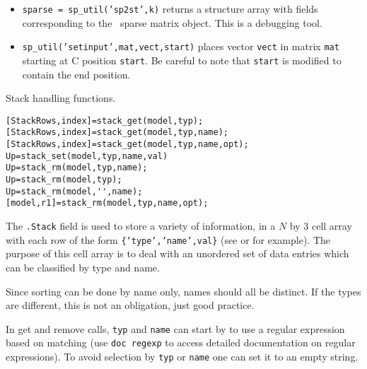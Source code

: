 \begin{itemize}
\item {\tt sparse = sp\_util('sp2st',k)} returns a structure array with fields corresponding to the \matlab\ sparse matrix object. This is a debugging tool.

\item {\tt sp\_util('setinput',mat,vect,start)} places vector {\tt vect} in matrix {\tt mat} starting at C position {\tt start}. Be careful to note that {\tt start} is modified to contain the end position. 

\end{itemize}


Stack handling functions.

\rsyntax\begin{verbatim}
[StackRows,index]=stack_get(model,typ);
[StackRows,index]=stack_get(model,typ,name);
[StackRows,index]=stack_get(model,typ,name,opt);
Up=stack_set(model,typ,name,val)
Up=stack_rm(model,typ,name);
Up=stack_rm(model,typ);
Up=stack_rm(model,'',name);
[model,r1]=stack_rm(model,typ,name,opt);
\end{verbatim}\nlvs


The {\tt .Stack} field is used to store a variety of information, in a $N$ by $3$ cell array with each row of the form {\tt \{'type','name',val\}} (see  or  for example). The purpose of this cell array is to deal with an unordered set of data entries which can be classified by type and name.

Since sorting can be done by name only, names should all be distinct. If the types are different, this is not an obligation, just good practice. 

In get and remove calls, {\tt typ} and {\tt name} can start by \ts{\#} to use a regular expression based on matching (use {\tt doc regexp} to access detailed documentation on regular expressions). To avoid selection by {\tt typ} or {\tt name} one can set it to an empty string.

